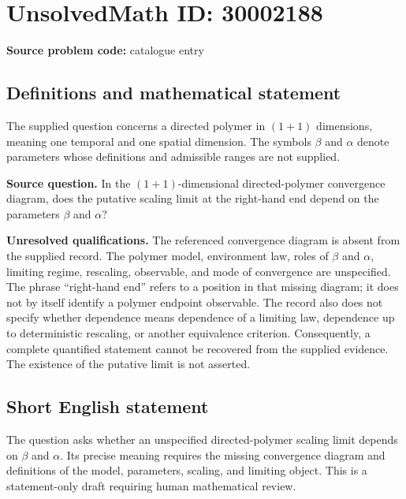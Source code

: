 \documentclass[11pt]{article}
\begin{document}
\section*{UnsolvedMath ID: 30002188}
\textbf{Source problem code:} catalogue entry
\subsection{Definitions and mathematical statement}
The supplied question concerns a directed polymer in $(1+1)$ dimensions, meaning one temporal and one spatial dimension. The symbols $\beta$ and $\alpha$ denote parameters whose definitions and admissible ranges are not supplied.

\textbf{Source question.} In the $(1+1)$-dimensional directed-polymer convergence diagram, does the putative scaling limit at the right-hand end depend on the parameters $\beta$ and $\alpha$?

\textbf{Unresolved qualifications.} The referenced convergence diagram is absent from the supplied record. The polymer model, environment law, roles of $\beta$ and $\alpha$, limiting regime, rescaling, observable, and mode of convergence are unspecified. The phrase ``right-hand end'' refers to a position in that missing diagram; it does not by itself identify a polymer endpoint observable. The record also does not specify whether dependence means dependence of a limiting law, dependence up to deterministic rescaling, or another equivalence criterion. Consequently, a complete quantified statement cannot be recovered from the supplied evidence. The existence of the putative limit is not asserted.
\subsection{Short English statement}
The question asks whether an unspecified directed-polymer scaling limit depends on $\beta$ and $\alpha$. Its precise meaning requires the missing convergence diagram and definitions of the model, parameters, scaling, and limiting object. This is a statement-only draft requiring human mathematical review.
\end{document}
